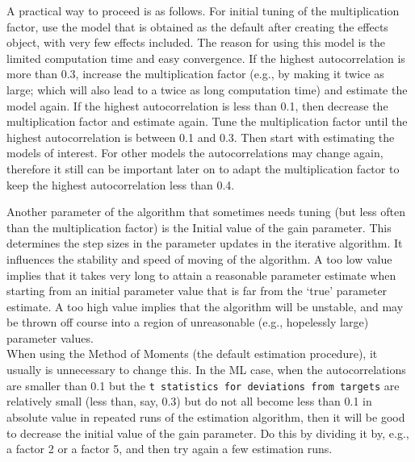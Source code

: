 \documentclass[a4paper,fleqn,11pt]{article}
\newcommand{\+}{\, + \,}
\begin{document}
A practical way to proceed is as follows.
For initial tuning of the multiplication factor, use the model that
is obtained as the default after creating the effects object,
with very few effects included. The reason for using this model
is the limited computation time and easy convergence.
If the highest autocorrelation is more than 0.3, increase the
multiplication factor (e.g., by making it twice as large;
which will also lead to a twice as long computation time)
and estimate the model again.
If the highest autocorrelation is less than 0.1, then decrease
the multiplication factor and estimate again.
Tune the multiplication factor until the highest autocorrelation
is between 0.1 and 0.3.
Then start with estimating the models of interest.
For other models the autocorrelations may change again, therefore
it still can be important later on to adapt the multiplication factor
to keep the highest autocorrelation less than 0.4.

Another parameter of the algorithm that sometimes needs tuning
(but less often than the multiplication factor)
is the \textsf{Initial value of the gain parameter}.
This determines the step sizes in the parameter updates in the iterative
algorithm.
It influences the stability and speed of moving of the algorithm.
A too low value implies that it takes very long to attain a
reasonable parameter estimate when starting from an initial
parameter value that is far from the `true' parameter estimate.
A too high value implies that the algorithm will be unstable,
and may be thrown off course into a region of unreasonable
(e.g., hopelessly large) parameter values.\\
When using the Method of Moments
(the default estimation procedure), it usually is unnecessary to change
this. In the ML case, when the autocorrelations are smaller
than 0.1 but the \texttt{t statistics for deviations from targets}
are relatively small (less than, say, 0.3) but do not all become
less than 0.1 in absolute value in repeated runs of the
estimation algorithm, then it will be good to decrease the
\textsf{initial value of the gain parameter}. Do this by dividing
it by, e.g., a factor 2 or a factor 5, and then try again
a few estimation runs.
\end{document}
